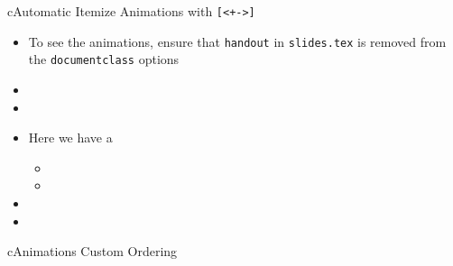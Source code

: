 \begin{myslide}{c}{Automatic Itemize Animations with \lstinline{[<+->]}}

\begin{itemize}[<+->]

\item To see the animations, ensure that \lstinline{handout} in \lstinline{slides.tex} is removed from the \lstinline{documentclass} options

\item \lipsum[1][1-2]

\item \lipsum[1][3]

\item Here we have a 

\begin{itemize}

\item \lipsum[1][3]

\item \lipsum[1][4-5]

\end{itemize}

\item \lipsum[1][4-5]

\item \lipsum[1][6]

\end{itemize}

\end{myslide}

\begin{myslide}{c}{Animations Custom Ordering}

\begin{columns}

\begin{column}{0.65\textwidth}

\begin{itemize}





\end{itemize}

\end{column}


\end{columns}

\end{myslide}

